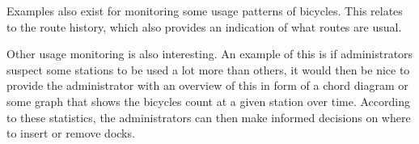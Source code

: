 Examples also exist for monitoring some usage patterns of bicycles.
This relates to the route history, which also provides an indication of what routes are usual.

Other usage monitoring is also interesting.
An example of this is if administrators suspect some stations to be used a lot more than others, it would then be nice to provide the administrator with an overview of this in form of a chord diagram or some graph that shows the bicycles count at a given station over time.
According to these statistics, the administrators can then make informed decisions on where to insert or remove docks.

